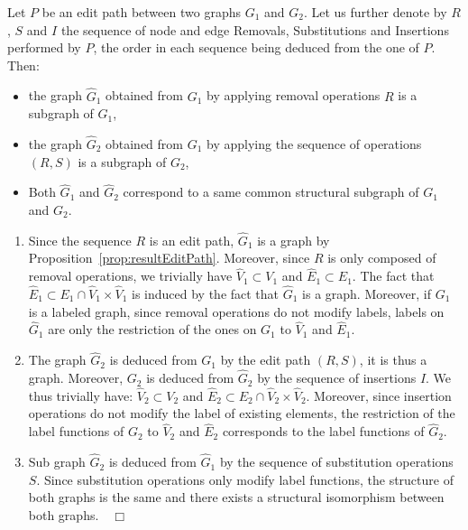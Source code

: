 \begin{proposition}\label{prop:editPathSubGraphs}
  Let $P$ be an edit path between two graphs $G_1$ and $G_2$. Let us
  further denote by $R$, $S$ and $I$ the sequence of node and edge
  Removals, Substitutions and Insertions performed by $P$, the order
  in each sequence being deduced from the one of $P$. Then:
  \begin{itemize}
  \item the graph $\hat{G}_1$ obtained from $G_1$ by applying
    removal operations $R$ is a subgraph of $G_1$,
  \item the graph $\hat{G}_2$ obtained from $G_1$ by applying
    the sequence of operations $(R,S)$ is a subgraph of $G_2$,
  \item Both $\hat{G}_1$ and $\hat{G}_2$ correspond to a same common
    structural subgraph of $G_1$ and $G_2$.
  \end{itemize}
\end{proposition}
  \begin{enumerate}
  \item Since the sequence $R$ is an edit path, $\hat{G}_1$ is a
    graph by Proposition~\ref{prop:resultEditPath}. Moreover, since
    $R$ is only composed of removal operations, we trivially have
    $\hat{V}_1\subset V_1$ and $\hat{E}_1 \subset E_1$. The fact that
    $\hat{E}_1\subset E_1\cap \hat{V}_1\times \hat{V}_1 $ is induced
    by the fact that $\hat{G}_1$ is a graph. Moreover, if $G_1$ is a
    labeled graph, since removal operations do not modify labels,
    labels on $\hat{G}_1$ are only the restriction of the ones on
    $G_1$ to $\hat{V}_1$ and $\hat{E}_1$.
  \item The graph $\hat{G}_2$ is deduced from $G_1$ by the edit path
    $(R,S)$, it is thus a graph. Moreover, $G_2$ is deduced from
    $\hat{G}_2$ by the sequence of insertions $I$. We thus trivially
    have: $\hat{V}_2\subset V_2$ and $\hat{E}_2 \subset E_2\cap
    \hat{V}_2\times\hat{V}_2 $.  Moreover, since insertion operations
    do not modify the label of existing elements, the restriction of
    the label functions of $G_2$ to $\hat{V}_2$ and $\hat{E}_2$
    corresponds to the label functions of $\hat{G}_2$.
  \item Sub graph $\hat{G}_2$ is deduced from $\hat{G}_1$ by the
    sequence of substitution operations $S$. Since substitution
    operations only modify label functions, the structure of both
    graphs is the same and there exists a structural isomorphism
    between both graphs.~~{$\Box$}
  \end{enumerate}
